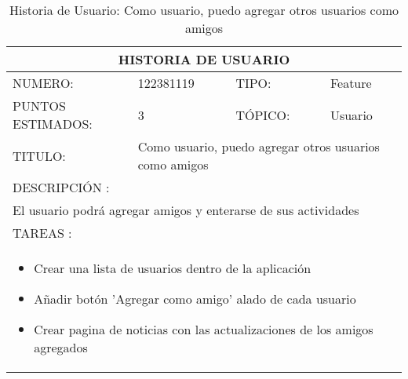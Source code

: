 \begin{table}[h]
\centering
\renewcommand{\arraystretch}{1.4}
\begin{tabular}{|*{4}{l|}}
\hline
\multicolumn{4}{|c|}{HISTORIA DE USUARIO} \\ \hline
NUMERO: & 122381119 & TIPO: & Feature \\ \hline
PUNTOS ESTIMADOS: & 3 & TÓPICO: & Usuario \\ \hline
TITULO: & \multicolumn{3}{|p{7.2cm}|}{ Como usuario, puedo agregar otros usuarios como amigos} \\ \hline
\multicolumn{4}{|l|}{DESCRIPCIÓN : } \\ \hline
\multicolumn{4}{|p{11cm}|}{El usuario podrá agregar amigos y enterarse de sus actividades} \\ \hline
\multicolumn{4}{|l|}{TAREAS : } \\ \hline
\multicolumn{4}{|p{11cm}|}{
\begin{minipage}[t]{\hsize}
  \begin{itemize}
    \item Crear una lista de usuarios dentro de la aplicación
    \item Añadir botón 'Agregar como amigo' alado de cada usuario
    \item Crear pagina de noticias con las actualizaciones de los amigos agregados
  \end{itemize}
\end{minipage}
} \\ \hline
\end{tabular}
\caption{Historia de Usuario: Como usuario, puedo agregar otros usuarios como amigos}
\label{tab:Primero}
\end{table}



